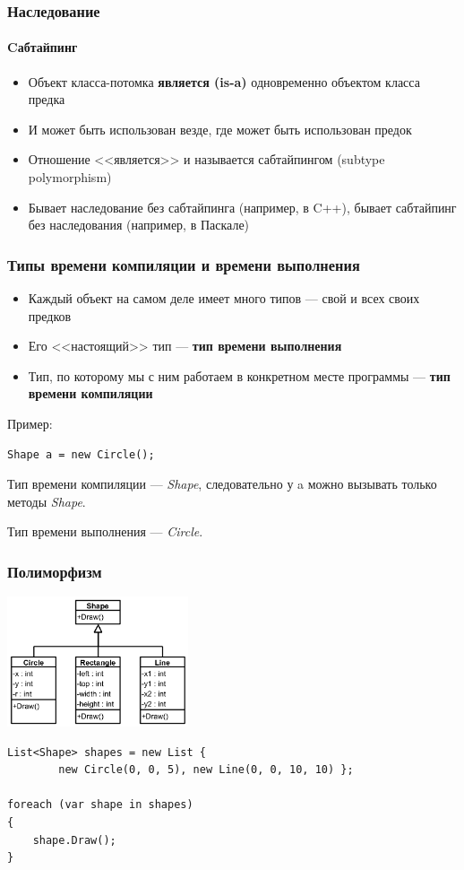 \documentclass{../../slides-style}
\begin{document}
    \begin{frame}
        \frametitle{Наследование}
        \framesubtitle{Cабтайпинг}
        \begin{itemize}
            \item Объект класса-потомка \textbf{является (is-a)} одновременно объектом класса предка
            \item И может быть использован везде, где может быть использован предок
            \item Отношение <<является>> и называется сабтайпингом (subtype polymorphism)
            \item Бывает наследование без сабтайпинга (например, в C++), бывает сабтайпинг  без наследования (например, в Паскале)
        \end{itemize}
    \end{frame}

    \begin{frame}[fragile]
        \frametitle{Типы времени компиляции и времени выполнения}
        \begin{itemize}
            \item Каждый объект на самом деле имеет много типов --- свой и всех своих предков
            \item Его <<настоящий>> тип --- \textbf{тип времени выполнения}
            \item Тип, по которому мы с ним работаем в конкретном месте программы --- \textbf{тип времени компиляции}
        \end{itemize}

        Пример:
        \begin{verbatim}
Shape a = new Circle();
        \end{verbatim}
        Тип времени компиляции --- \textit{Shape}, следовательно у a можно вызывать только методы \textit{Shape}. 
        
        Тип времени выполнения --- \textit{Circle}.
    \end{frame}

    \begin{frame}[fragile]
        \frametitle{Полиморфизм}
        \begin{center}
            \includegraphics[width=0.4\textwidth]{polymorphism.png}
        \end{center}

        \begin{verbatim}
List<Shape> shapes = new List { 
        new Circle(0, 0, 5), new Line(0, 0, 10, 10) };

foreach (var shape in shapes) 
{
    shape.Draw();
}
        \end{verbatim}
    \end{frame}
\end{document}
